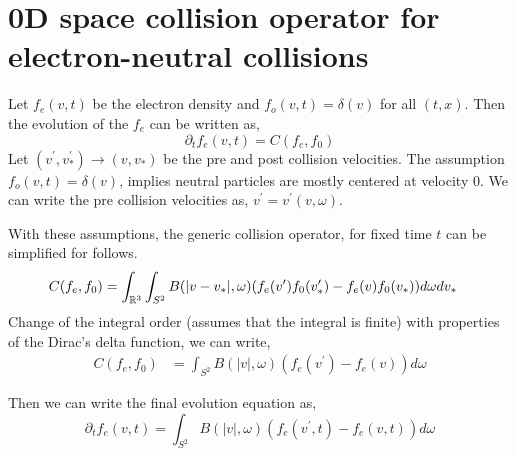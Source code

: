 \documentclass{article}
\begin{document}


\section{0D space collision operator for electron-neutral collisions}
\label{sec:electron_neutral_pc}
Let $f_e(v,t)$ be the electron density and $f_o(v,t)=\delta(v)$ for all $(t,x)$. Then the evolution of the $f_e$ can be written as, 
\begin{equation}
    \partial_t f_e(v,t) = C(f_e,f_0)
\end{equation}
Let $(v^\prime,v_*^\prime) \rightarrow (v,v_*)$ be the pre and post collision velocities. The assumption $f_o(v,t)=\delta(v)$, implies neutral particles are mostly centered at velocity $0$. We can write the pre collision velocities as, $v^\prime=v^\prime(v,\omega)$. 

With these assumptions, the generic collision operator, for fixed time $t$ can be simplified for follows. 
\begin{align}
    C(f_e,f_0) &= \int_{\mathbb{R}^3}\int_{S^2} B(|v-v_*|,\omega)(f_e(v^\prime)f_0(v_*^\prime) - f_e(v)f_0(v_*) ) d\omega dv_*
\end{align}
Change of the integral order (assumes that the integral is finite) with properties of the Dirac's delta function, we can write, 
\begin{align}
    C(f_e,f_0) &= \int_{S^2} B(|v|,\omega)(f_e(v^\prime) - f_e(v)) d\omega
\end{align}

Then we can write the final evolution equation as, 
\begin{equation}
    \partial_t f_e(v,t) = \int_{S^2} B(|v|,\omega)(f_e(v^\prime,t) - f_e(v,t)) d\omega
\end{equation}
\end{document}
